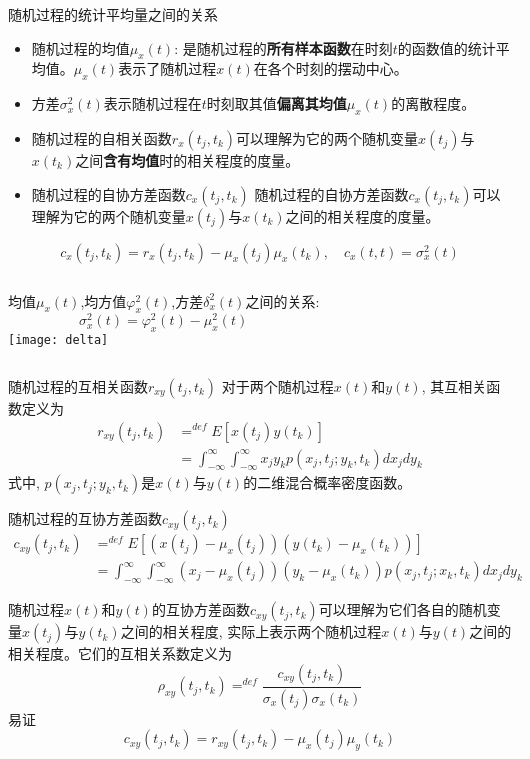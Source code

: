 \begin{frame}{随机过程的统计平均量之间的关系}
\small
\begin{itemize}
	\item 随机过程的均值$\mu_x(t)$: 是随机过程的\textbf{所有样本函数}在时刻$t$的函数值的统计平均值。$\mu_x(t)$表示了随机过程$x(t)$在各个时刻的摆动中心。
	\item 方差$\sigma_x^2(t)$表示随机过程在$t$时刻取其值\textbf{偏离其均值}$\mu_x(t)$的离散程度。
	\item 随机过程的自相关函数$r_x(t_j,t_k)$可以理解为它的两个随机变量$x(t_j)$与$x(t_k)$之间\textbf{含有均值}时的相关程度的度量。
	\item 随机过程的自协方差函数$c_x(t_j,t_k)$
	随机过程的自协方差函数$c_x(t_j,t_k)$可以理解为它的两个随机变量$x(t_j)$与$x(t_k)$之间的相关程度的度量。
\end{itemize}
\[c_x(t_j,t_k)=r_x(t_j,t_k)-\mu_x(t_j)\mu_x(t_k),\quad c_x(t,t)=\sigma_x^2(t)\]
\begin{columns}
	均值$\mu_x(t)$,均方值$\varphi_x^2(t)$,方差$\delta_x^2(t)$之间的关系:
	\[\sigma_x^2(t)=\varphi_x^2(t)-\mu_x^2(t)\]
	\texttt{[image: delta]}
\end{columns}
\end{frame}

\begin{frame}
\begin{block}{随机过程的互相关函数$r_{xy}(t_j,t_k)$}
对于两个随机过程$x(t)$和$y(t)$, 其互相关函数定义为
\begin{align*}
r_{xy}(t_j,t_k) &\mathop{=}^{def}E[x(t_j)y(t_k)]\\
&=\int_{-\infty}^{\infty}\int_{-\infty}^{\infty}x_jy_kp(x_j,t_j;y_k,t_k)dx_jdy_k
\end{align*}
式中, $p(x_j,t_j;y_k,t_k)$是$x(t)$与$y(t)$的二维混合概率密度函数。
\end{block}
\end{frame}

\begin{frame}
\begin{block}{随机过程的互协方差函数$c_{xy}(t_j,t_k)$}
\begin{align*}
c_{xy}(t_j,t_k)&\mathop{=}^{def}E[(x(t_j)-\mu_x(t_j))(y(t_k)-\mu_x(t_k))]\\
&=\int_{-\infty}^{\infty}\int_{-\infty}^{\infty}(x_j-\mu_x(t_j))(y_k-\mu_x(t_k))p(x_j,t_j;x_k,t_k)dx_jdy_k
\end{align*}
\end{block}
随机过程$x(t)$和$y(t)$的互协方差函数$c_{xy}(t_j,t_k)$可以理解为它们各自的随机变量$x(t_j)$与$y(t_k)$之间的相关程度, 实际上表示两个随机过程$x(t)$与$y(t)$之间的相关程度。它们的互相关系数定义为
\[\rho_{xy}(t_j,t_k)\mathop{=}^{def}\frac{c_{xy}(t_j,t_k)}{\sigma_x(t_j)\sigma_x(t_k)}\]
易证
\[c_{xy}(t_j,t_k)=r_{xy}(t_j,t_k)-\mu_x(t_j)\mu_y(t_k)\]
\end{frame}

